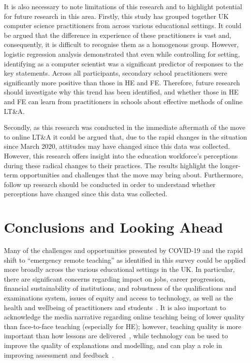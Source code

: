 \documentclass[sigconf]{acmart}
\begin{document}
It is also necessary to note limitations of this research and to
highlight potential for future research in this area. Firstly, this
study has grouped together UK computer science practitioners from
across various educational settings. It could be argued that the
difference in experience of these practitioners is vast and,
consequently, it is difficult to recognise them as a homogenous
group. However, logistic regression analysis demonstrated that even
while controlling for setting, identifying as a computer scientist was
a significant predictor of responses to the key statements. Across all
participants, secondary school practitioners were significantly more
positive than those in HE and FE. Therefore, future research should
investigate why this trend has been identified, and whether those in
HE and FE can learn from practitioners in schools about effective
methods of online LT\&A.

Secondly, as this research was conducted in the immediate aftermath of
the move to online LT\&A it could be argued that, due to the rapid
changes in the situation since March 2020, attitudes may have changed
since this data was collected. However, this research offers insight
into the education workforce’s perceptions during these radical
changes to their practices. The results highlight the longer-term
opportunities and challenges that the move may bring
about. Furthermore, follow up research should be conducted in order to
understand whether perceptions have changed since this data was
collected.

\section{Conclusions and Looking Ahead}\label{conclusions}

Many of the challenges and opportunities presented by COVID-19 and the
rapid shift to ``emergency remote teaching'' as identified in this
survey could be applied more broadly across the various educational
settings in the UK. In particular, there are significant concerns
regarding impact on jobs, career progression, financial sustainability
of institutions, and robustness of the qualifications and examinations
system, issues of equity and access to technology, as well as the
health and wellbeing of practitioners and
students~\cite{watermeyer-et-al:he2020}. It is also important to
acknowledge the media narrative regarding online teaching being of
lower quality than face-to-face teaching (especially for HE); however,
teaching quality is more important than how lessons are
delivered~\cite{eefremote:2020}, while technology can be used to
improve the quality of explanations and modelling, and can play a role
in improving assessment and feedback~\cite{eefdigtech:2019}.
\end{document}
